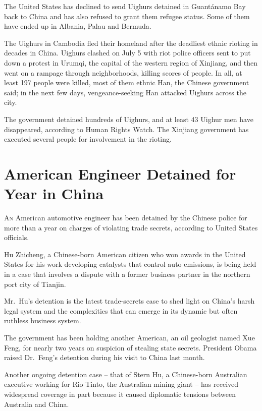 ﻿\documentclass[12pt]{article}
\begin{document}
The United States has declined to send Uighurs detained in Guant\'anamo Bay back to China and has
also refused to grant them refugee status. Some of them have ended up in Albania, Palau and Bermuda.

The Uighurs in Cambodia fled their homeland after the deadliest ethnic rioting in decades in China.
Uighurs clashed on July 5 with riot police officers sent to put down a protest in Urumqi, the
capital of the western region of Xinjiang, and then went on a rampage through neighborhoods, killing
scores of people. In all, at least 197 people were killed, most of them ethnic Han, the Chinese
government said; in the next few days, vengeance-seeking Han attacked Uighurs across the city.

The government detained hundreds of Uighurs, and at least 43 Uighur men have disappeared, according
to Human Rights Watch. The Xinjiang government has executed several people for involvement in the
rioting.

\section{American Engineer Detained for Year in China}

\lettrine{A}{n} American automotive engineer has been detained by the
Chinese police for more than a year on charges of violating trade secrets, according to United
States officials.

Hu Zhicheng, a Chinese-born American citizen who won awards in the United States for his work
developing catalysts that control auto emissions, is being held in a case that involves a dispute
with a former business partner in the northern port city of Tianjin.

Mr.~Hu's detention is the latest trade-secrets case to shed light on China's harsh legal system and
the complexities that can emerge in its dynamic but often ruthless business system.

The government has been holding another American, an oil geologist named Xue Feng, for nearly two
years on suspicion of stealing state secrets. President Obama raised Dr.~Feng's detention during his
visit to China last month.

Another ongoing detention case -- that of Stern Hu, a Chinese-born Australian executive working for
Rio Tinto, the Australian mining giant -- has received widespread coverage in part because it caused
diplomatic tensions between Australia and China.
\end{document}
